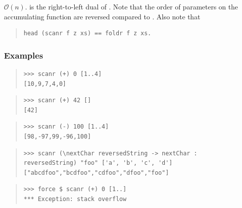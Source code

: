 \begin{haddockdesc}
\item[\begin{tabular}{@{}l}
scanr :: (a -> b -> b) -> b -> {\char 91}a{\char 93} -> {\char 91}b{\char 93}
\end{tabular}]
{\haddockbegindoc
\(\mathcal{O}(n)\).  is the right-to-left dual of . Note that the order of parameters on the accumulating function are reversed compared to .
 Also note that\par
\begin{quote}
{\haddockverb\begin{verbatim}
head (scanr f z xs) == foldr f z xs.\end{verbatim}}
\end{quote}
\subsubsection*{\textbf{Examples}}
\begin{quote}
{\haddockverb\begin{verbatim}
>>> scanr (+) 0 [1..4]
[10,9,7,4,0]

\end{verbatim}}
\end{quote}
\begin{quote}
{\haddockverb\begin{verbatim}
>>> scanr (+) 42 []
[42]

\end{verbatim}}
\end{quote}
\begin{quote}
{\haddockverb\begin{verbatim}
>>> scanr (-) 100 [1..4]
[98,-97,99,-96,100]

\end{verbatim}}
\end{quote}
\begin{quote}
{\haddockverb\begin{verbatim}
>>> scanr (\nextChar reversedString -> nextChar : reversedString) "foo" ['a', 'b', 'c', 'd']
["abcdfoo","bcdfoo","cdfoo","dfoo","foo"]

\end{verbatim}}
\end{quote}
\begin{quote}
{\haddockverb\begin{verbatim}
>>> force $ scanr (+) 0 [1..]
*** Exception: stack overflow

\end{verbatim}}
\end{quote}}
\end{haddockdesc}
